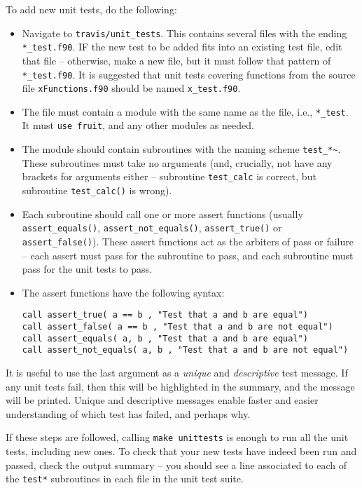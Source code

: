 To add new unit tests, do the following:

\begin{itemize}
\item Navigate to \texttt{travis/unit\_tests}. This contains several
  files with the ending \texttt{*\_test.f90}. IF the new test to be
  added fits into an existing test file, edit that file -- otherwise,
  make a new file, but it must follow that pattern of
  \texttt{*\_test.f90}. It is suggested that unit tests covering
  functions from the source file \texttt{xFunctions.f90} should be
  named \texttt{x\_test.f90}.
\item The file must contain a module with the same name as the file,
  i.e., \texttt{*\_test}. It must \texttt{use\ fruit}, and any other
  modules as needed.
\item The module should contain subroutines with the naming scheme
  \texttt{test\_*\textasciitilde{}}. These subroutines must take no
  arguments (and, crucially, not have any brackets for arguments
  either -- subroutine \texttt{test\_calc} is correct, but subroutine
  \texttt{test\_calc()} is wrong).
\item Each subroutine should call one or more assert functions
  (usually \texttt{assert\_equals()}, \texttt{assert\_not\_equals()},
  \texttt{assert\_true()} or \texttt{assert\_false()}). These assert
  functions act as the arbiters of pass or failure -- each assert must
  pass for the subroutine to pass, and each subroutine must pass for
  the unit tests to pass.
\item The assert functions have the following syntax:

\begin{verbatim}
call assert_true( a == b , "Test that a and b are equal")
call assert_false( a == b , "Test that a and b are not equal")
call assert_equals( a, b , "Test that a and b are equal")
call assert_not_equals( a, b , "Test that a and b are not equal")
\end{verbatim}

\end{itemize}

It is useful to use the last argument as a \emph{unique} and
\emph{descriptive} test message. If any unit tests fail, then this
will be highlighted in the summary, and the message will be
printed. Unique and descriptive messages enable faster and easier
understanding of which test has failed, and perhaps why.

If these steps are followed, calling \texttt{make\ unittests} is
enough to run all the unit tests, including new ones. To check that
your new tests have indeed been run and passed, check the output
summary -- you should see a line associated to each of the
\texttt{test*} subroutines in each file in the unit test suite.

